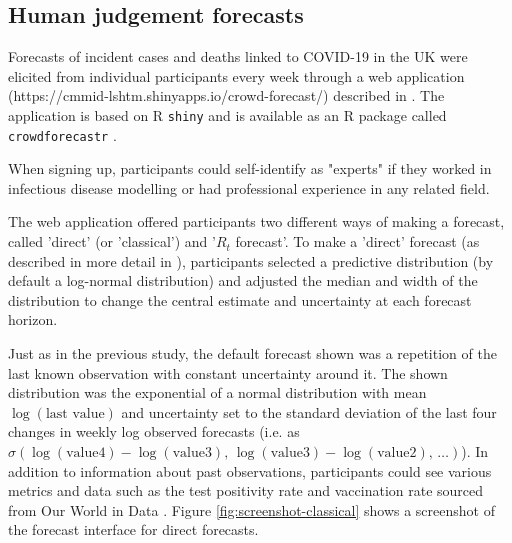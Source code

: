\documentclass[10pt,a4paper,twocolumn]{article}
\begin{document}
\subsection*{Human judgement forecasts}

Forecasts of incident cases and deaths linked to COVID-19 in the UK were elicited from individual participants every week through a web application (https://cmmid-lshtm.shinyapps.io/crowd-forecast/) described in \cite{bosseComparingHumanModelbased2022}. The application is based on \textsf{R} \cite{R} \texttt{shiny} \cite{shiny} and is available as an \textsf{R} package called \texttt{crowdforecastr} \citep{crowdforecastr}. 

When signing up, participants could self-identify as "experts" if they worked in infectious disease modelling or had professional experience in any related field. 

The web application offered participants two different ways of making a forecast, called 'direct' (or 'classical') and '$R_t$ forecast'. To make a 'direct' forecast (as described in more detail in \cite{bosseComparingHumanModelbased2022}), participants selected a predictive distribution (by default a log-normal distribution) and adjusted the median and width of the distribution to change the central estimate and uncertainty at each forecast horizon. 

Just as in the previous study, the default forecast shown was a repetition of the last known observation with constant uncertainty around it. The shown distribution was the exponential of a normal distribution with mean $\log (\text{last value})$ and uncertainty set to the standard deviation of the last four changes in weekly log observed forecasts (i.e. as $\sigma(\log(\text{value4}) - \log(\text{value3}), \, \log(\text{value3}) - \log(\text{value2}), \, \dots)$).
In addition to information about past observations, participants could see various metrics and data such as the test positivity rate and vaccination rate sourced from Our World in Data \citep{owidcoronavirus}. Figure \ref{fig:screenshot-classical} shows a screenshot of the forecast interface for direct forecasts. 
\end{document}
